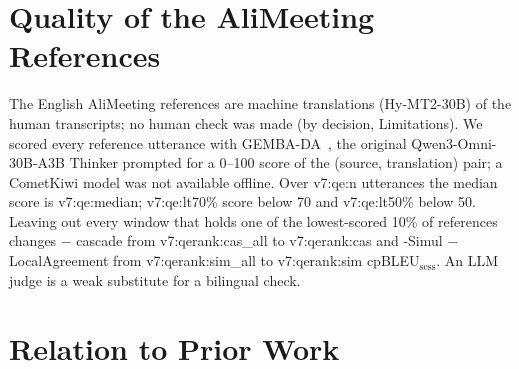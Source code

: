 \section{Quality of the AliMeeting References}
\label{app:qe7}

The English AliMeeting references are machine translations (Hy-MT2-30B) of the human transcripts; no human check was made
(by decision, Limitations). We scored every reference utterance with GEMBA-DA~\citep{kocmi2023large}, the original
Qwen3-Omni-30B-A3B Thinker prompted for a 0--100 score of the (source, translation) pair; a CometKiwi model was not
available offline. Over \num{v7:qe:n} utterances the median score is \num{v7:qe:median}; \num{v7:qe:lt70}\% score below 70
and \num{v7:qe:lt50}\% below 50. Leaving out every window that holds one of the lowest-scored 10\% of references changes
\sys{} $-$ cascade from \num{v7:qerank:cas_all} to \num{v7:qerank:cas} and \sys{}-Simul $-$ LocalAgreement from
\num{v7:qerank:sim_all} to \num{v7:qerank:sim} cpBLEU$_\text{sess}$. An LLM judge is a weak substitute for a bilingual check.

\section{Relation to Prior Work}
\label{app:related7}

\begin{table}[h]
\centering\small
\setlength{\tabcolsep}{2.4pt}
\caption{What prior multi-speaker and simultaneous translation work supports and reports. Concurrent speakers: two
people talking at once are translated as two speakers. Latency on overlap: measured on overlapping multi-party meetings.
$^a$\,\citet{seamless2023,labiausse2025hibiki,cheng2025liveinterpret,deng2025simuls2s}. $^b$\,One recognition
stream, each committed span routed to one speaker; cascades that translate diarizer turns in parallel (our baselines)
can translate two concurrent speakers. Details: Table~\ref{tab:related7}.}
\label{tab:related8}
\end{table}

